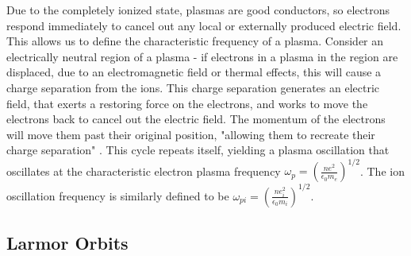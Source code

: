 \documentclass{article}
\begin{document}
 Due to the completely ionized state, plasmas are good conductors, so electrons respond immediately to cancel out any local or externally produced electric field. This allows us to define the characteristic frequency of a plasma. Consider an electrically neutral region of a plasma -  if electrons in a plasma in the region are displaced, due to an electromagnetic field or thermal effects, this will cause a charge separation from the ions. This charge separation generates an electric field, that exerts a restoring force on the electrons, and works to move the electrons back to cancel out the electric field. The momentum of the electrons will move them past their original position, "allowing them to recreate their charge separation" \cite{Wesson}. This cycle repeats itself, yielding a plasma oscillation that oscillates at the characteristic electron plasma frequency $\omega_p = (\frac{ne^2}{\epsilon_0 m_e})^{1/2}$. The ion oscillation frequency is similarly defined to be $\omega_{pi} =  (\frac{ne_i^2}{\epsilon_0 m_i})^{1/2}$. \\


\subsection{Larmor Orbits}
\end{document}
